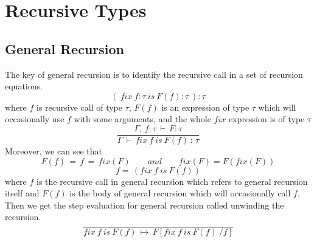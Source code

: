 \documentclass{article}
\begin{document}
%


\section{Recursive Types}
\subsection*{General Recursion}
The key of general recursion is to identify the recursive call in a set of recursion equations.
\begin{equation*}
(\ fix\  f:\tau\ is\ F(f):\tau\ ):\tau
\end{equation*}
where $f$ is recursive call of type $\tau$, $F(f)$ is an expression of type $\tau$ which will occasionally use $f$ with some arguments, and the whole $fix$ expression is of type $\tau$
\begin{equation*}
\frac{\Gamma,\, f:\tau\,\vdash\,F:\tau}{\Gamma\,\vdash\,fix\ f\ is\ F(f)\,:\,\tau}
\end{equation*}
Moreover, we can see that
\begin{equation*}
F(f)\,=\,f\,=\,fix(F)\qquad and \qquad fix(F) = F(fix(F))
\end{equation*}
\begin{equation*}
f=\,(fix\  f\ is\ F(f))
\end{equation*}
where $f$ is the recursive call in general recursion which refers to general recursion itself and $F(f)$ is the body of general recursion which will occasionally call $f$. Then we get the step evaluation for general recursion called unwinding the recursion.
\begin{equation*}
\frac{}
{fix\ f\ is\ F(f)\,\mapsto\,F[fix\ f\ is\ F(f)\ /f]}
\end{equation*}
\end{document}
